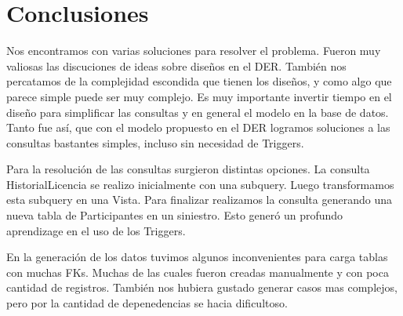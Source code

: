 \section{Conclusiones}


Nos encontramos con varias soluciones para resolver el problema. Fueron muy valiosas las discuciones de ideas sobre diseños en el DER. También nos percatamos de la complejidad escondida que tienen los diseños, y como algo que parece simple puede ser muy complejo.
Es muy importante invertir tiempo en el diseño para simplificar las consultas y en general el modelo en la base de datos. Tanto fue así, que con el modelo propuesto en el DER logramos soluciones a las consultas bastantes simples, incluso sin necesidad de Triggers.

Para la resolución de las consultas surgieron distintas opciones. La consulta HistorialLicencia se realizo inicialmente con una subquery. Luego transformamos esta subquery en una Vista. Para finalizar realizamos la consulta generando una nueva tabla de Participantes en un siniestro. Esto generó un profundo aprendizage en el uso de los Triggers.

En la generación de los datos tuvimos algunos inconvenientes para carga tablas con muchas FKs. Muchas de las cuales fueron creadas manualmente y con poca cantidad de registros. También nos hubiera gustado generar casos mas complejos, pero por la cantidad de depenedencias se hacia dificultoso.




